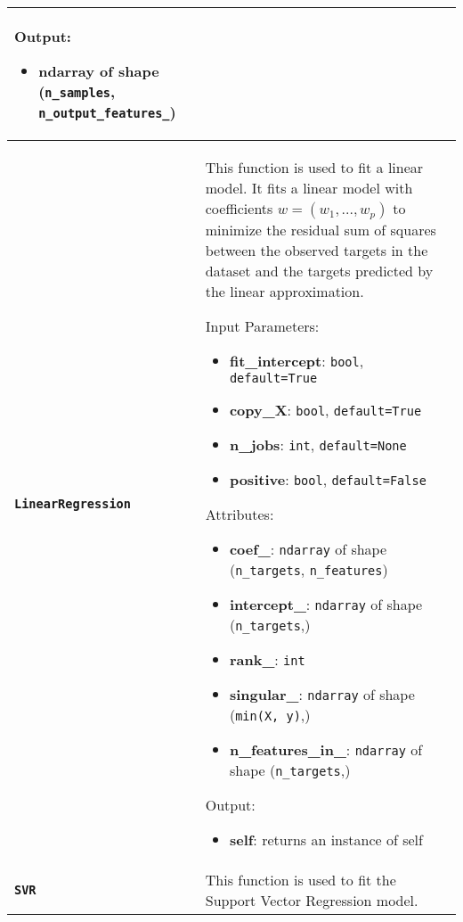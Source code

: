 \begin{longtable}{|l|p{12cm}|}
    Output:
    \begin{itemize}
        \item \textbf{ndarray} of shape (\texttt{n\_samples}, \texttt{n\_output\_features\_})
    \end{itemize}\\* 
    \hline

    \textbf{\texttt{LinearRegression}} &
    This function is used to fit a linear model. It fits a linear model with coefficients $w = (w_1, ..., w_p)$ to minimize the residual sum of squares between the observed targets in the dataset and the targets predicted by the linear approximation.

    Input Parameters:
    \begin{itemize}
        \item \textbf{fit\_intercept}: \texttt{bool}, \texttt{default=True}
        \item \textbf{copy\_X}: \texttt{bool}, \texttt{default=True}
        \item \textbf{n\_jobs}: \texttt{int}, \texttt{default=None}
        \item \textbf{positive}: \texttt{bool}, \texttt{default=False}
    \end{itemize}

    Attributes:
    \begin{itemize}
        \item \textbf{coef\_}: \texttt{ndarray} of shape (\texttt{n\_targets}, \texttt{n\_features})
        \item \textbf{intercept\_}: \texttt{ndarray} of shape (\texttt{n\_targets},)
        \item \textbf{rank\_}: \texttt{int}
        \item \textbf{singular\_}: \texttt{ndarray} of shape (\texttt{min(X, y)},)
        \item \textbf{n\_features\_in\_}: \texttt{ndarray} of shape (\texttt{n\_targets},)
    \end{itemize}

    Output:
    \begin{itemize}
        \item \textbf{self}: returns an instance of self
    \end{itemize}\\*
    \hline

    \textbf{\texttt{SVR}} &
    This function is used to fit the Support Vector Regression model.


\end{longtable}
